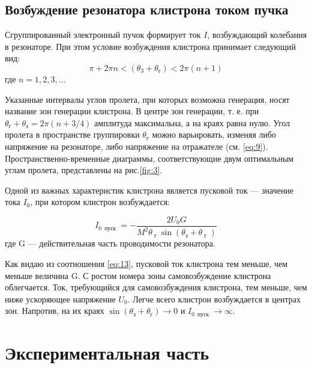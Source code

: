 \subsection{Возбуждение резонатора клистрона током пучка}
Сгруппированный электронный пучок формирует ток $I$, возбуждающий колебания в резонаторе. При этом условие возбуждения клистрона принимает следующий вид:
\begin{equation}
	\pi + 2 \pi n < \left( \theta _ { 3 } + \theta _ { \text{г} } \right) < 2 \pi ( n + 1 )
	\label{eq:12}
\end{equation}где $n=1,2,3,\dots $

Указанные интервалы углов пролета, при которых возможна генерация, носят название зон генерации клистрона. В центре зон генерации, т. е. при
$\theta _ { \text{г} } + \theta _ { \text{з} } = 2 \pi ( n + 3 / 4 )$ амплитуда максимальна, а на краях равна нулю. Угол пролета в пространстве группировки $\theta _ { \text{г} }$ можно варьировать, изменяя ли­бо напряжение на резонаторе, либо напряжение на отражателе (см. \eqref{eq:9}).
Пространственно-временные диаграммы, соответствующие двум оптималь­ным углам пролета, представлены на рис.\ref{fig:3}.

Одной из важных характеристик клистрона является пусковой ток — значение тока $I_0$, при котором клистрон возбуждается:

\begin{equation}
	I _ { 0 \, \text { пуск } } = - \frac { 2 U _ { 0 } G } { M ^ { 2 } 
	\theta _ { \text{ г } } \sin \left( \theta _ { \text{з} } + \theta _ { \text{ г } } \right) }
	\label{eq:13}
\end{equation} где G — действительная часть проводимости резонатора.

Как видаю из соотношения \eqref{eq:13}, пусковой ток клистрона тем меньше, чем меньше величина G. С ростом номера зоны самовозбуждение клистрона облегчается. Ток, требующийся для самовозбуждения клистрона, тем меньше, чем ниже ускоряющее напряжение $U_0$. Легче всего клистрон возбуждается в центрах зон. Напротив, на их краях 
$\sin \left( \theta _ { \text{з} } + \theta _ { \text{г} } \right) \rightarrow 0$ и 
$I _ { 0\, \text { пуск } } \rightarrow \infty$.

\section{Экспериментальная часть}


